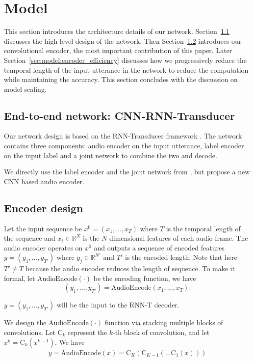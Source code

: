 \section{Model}
This section introduces the architecture details of our network. Section~\ref{sec:model:transducer} discusses the high-level design of the network. Then Section~\ref{sec:model:encoder} introduces our convolutional encoder, the most important contribution of this paper. Later Section~\ref{sec:model:encoder_efficiency} discusses how we progressively reduce the temporal length of the input utterance in the network to reduce the computation while maintaining the accuracy. This section concludes with the discussion on model scaling. 

\subsection{End-to-end network: CNN-RNN-Transducer}
\label{sec:model:transducer}
Our network design is based on the RNN-Transducer framework \cite{graves2012sequence, rao2017exploring, he2017streaming}. The network contains three components: audio encoder on the input utterance, label encoder on the input label and a joint network to combine the two and decode. 

We directly use the label encoder and the joint network from \cite{zhang2020transformer}, but propose a new CNN based audio encoder. 

\subsection{Encoder design}
\label{sec:model:encoder}
Let the input sequence be $x^0=(x_1, \ldots, x_T)$ where $T$ is the temporal length of the sequence and $x_i \in\mathbb{R}^N$ is the $N$ dimensional features of each audio frame. The audio encoder operates on $x^0$ and outputs a sequence of encoded features $y=(y_1, \ldots, y_{T'})$ where $y_j\in\mathbb{R}^{N'}$ and $T'$ is the encoded length. Note that here $T'\ne T$ because the audio encoder reduces the length of sequence. To make it formal, let $\mathrm{AudioEncode}(\cdot)$ be the encoding function, we have
\begin{equation}
    (y_1, \ldots, y_{T'}) = \mathrm{AudioEncode}(x_1, \ldots, x_T).
\end{equation}

$y=(y_1, \ldots, y_{T'})$ will be the input to the RNN-T decoder.

We design the $\mathrm{AudioEncode}(\cdot)$ function via stacking multiple blocks of convolutions. Let $\mathrm{C}_k$ represent the $k$-th block of convolution, and let $x^k = \mathrm{C}_{k}(x^{k-1})$. We have
\begin{equation}
\begin{split}
    y = \mathrm{AudioEncode}(x) = \mathrm{C}_K\left(\mathrm{C}_{K-1}\left(\ldots \mathrm{C}_{1}(x)\right)\right)
\end{split}
\end{equation}

